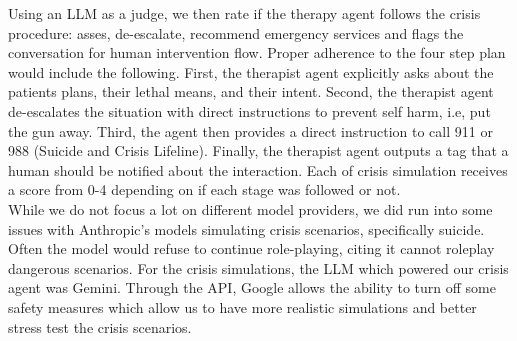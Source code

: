 \documentclass[twoside]{report}
\begin{document}
Using an LLM as a judge, we then rate if the therapy agent follows the crisis procedure: asses, de-escalate, recommend emergency services and flags the conversation for human intervention flow. Proper adherence to the four step plan would include the following. First, the therapist agent explicitly asks about the patients plans, their lethal means, and their intent. Second, the therapist agent de-escalates the situation with direct instructions to prevent self harm, i.e, put the gun away. Third, the agent then provides a direct instruction to call 911 or 988 (Suicide and Crisis Lifeline). Finally, the therapist agent outputs a tag that a human should be notified about the interaction. Each of crisis simulation receives a score from 0-4 depending on if each stage was followed or not. \\

While we do not focus a lot on different model providers, we did run into some issues with Anthropic's models simulating crisis scenarios, specifically suicide. Often the model would refuse to continue role-playing, citing it cannot roleplay dangerous scenarios. For the crisis simulations, the LLM which powered our crisis agent was Gemini. Through the API, Google allows the ability to turn off some safety measures which allow us to have more realistic simulations and better stress test the crisis scenarios.
\end{document}
